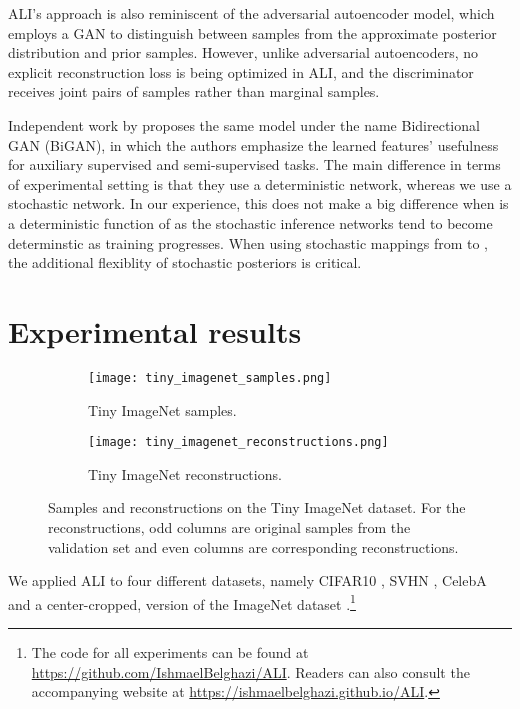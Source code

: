 \documentclass{article}
\newcommand{\figureHeight}{5cm}
\begin{document}
ALI's approach is also reminiscent of the adversarial autoencoder model, which
employs a GAN to distinguish between samples from the approximate posterior
distribution  and prior samples. However, unlike
adversarial autoencoders, no explicit reconstruction loss is being optimized in
ALI, and the discriminator receives joint pairs of samples 
rather than marginal  samples.

Independent work by \citet{donahue2016adversarial} proposes the same model under
the name Bidirectional GAN (BiGAN), in which the authors emphasize the learned
features' usefulness for auxiliary supervised and semi-supervised tasks. The
main difference in terms of experimental setting is that they use a
deterministic  network, whereas we use a stochastic
network. In our experience, this does not make a big difference when  is
a deterministic function of  as the stochastic inference networks tend
to become determinstic as training progresses. When using stochastic mappings
from  to , the additional flexiblity of stochastic posteriors is
critical.

\section{Experimental results}

\begin{figure}[t]
    \centering
    \begin{subfigure}[t]{0.49\textwidth}
        \centering
        \texttt{[image: tiny\_imagenet\_samples.png]}
        \caption{\label{fig:tiny_imagenet_samples} Tiny ImageNet samples.}
    \end{subfigure}
    \hfill
    \begin{subfigure}[t]{0.49\textwidth}
        \centering
        \texttt{[image: tiny\_imagenet\_reconstructions.png]}
        \caption{\label{fig:tiny_imagenet_reconstructions} Tiny ImageNet
            reconstructions.}
    \end{subfigure}
    \caption{\label{fig:tiny_imagenet_images} Samples and reconstructions on the
        Tiny ImageNet dataset. For the reconstructions, odd columns are original
        samples from the validation set and even columns are corresponding
        reconstructions.}
\end{figure}

We applied ALI to four different datasets, namely CIFAR10
\citep{krizhevsky2009learning}, SVHN \citep{netzer2011reading}, CelebA
\citep{liu2015deep} and a center-cropped,  version of the ImageNet
dataset \citep{russakovsky2015imagenet}.\footnote{
    The code for all experiments can be found at
    \url{https://github.com/IshmaelBelghazi/ALI}. Readers can also consult the
    accompanying website at \url{https://ishmaelbelghazi.github.io/ALI}.}
\end{document}
